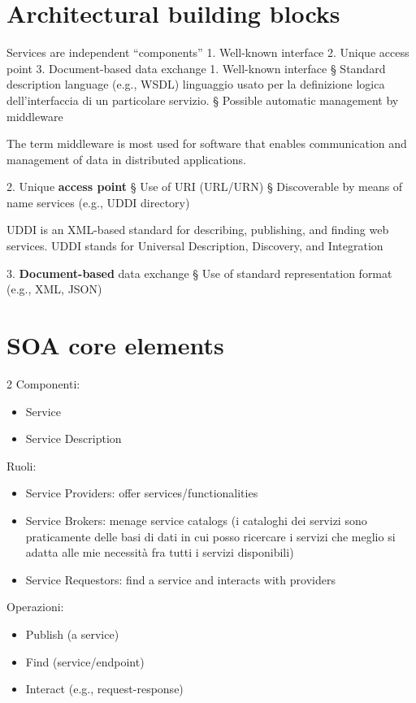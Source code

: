 \section{Architectural building blocks}
Services are independent “components”
1. Well-known interface
2. Unique access point
3. Document-based data exchange
1. Well-known interface
§ Standard description language (e.g., WSDL) linguaggio usato per la definizione logica dell'interfaccia di un particolare servizio.
§ Possible automatic management by middleware

The term middleware is most used
for software that enables
communication and management of
data in distributed applications.

2. Unique \textbf{access point}
§ Use of URI (URL/URN)
§ Discoverable by means of name services (e.g., UDDI directory)

UDDI is an XML-based standard for describing, publishing, and finding web
services. UDDI stands for Universal
Description, Discovery, and Integration

3. \textbf{Document-based} data exchange
§ Use of standard representation format (e.g., XML, JSON)

\section{SOA core elements}
2 Componenti:
\begin{itemize}
    \item Service
    \item Service Description
\end{itemize}
Ruoli:
\begin{itemize}
    \item Service Providers: offer services/functionalities
    \item Service Brokers: menage service catalogs (i cataloghi dei servizi sono praticamente delle basi di dati in cui posso ricercare i servizi che meglio si adatta alle mie necessità fra tutti i servizi disponibili)
    \item Service Requestors: find a service and interacts with providers
\end{itemize}
Operazioni:
\begin{itemize}
    \item Publish (a service)
    \item Find (service/endpoint)
    \item Interact (e.g., request-response)
\end{itemize}


